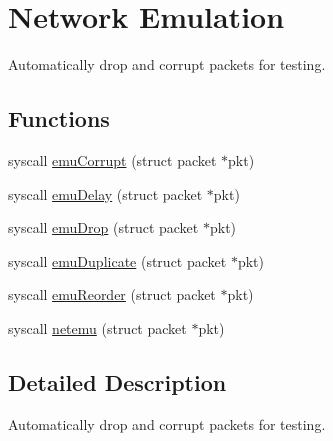 \hypertarget{group__netemu}{\section{Network Emulation}
\label{group__netemu}
}


Automatically drop and corrupt packets for testing.  


\subsection*{Functions}
\begin{DoxyCompactItemize}
\item 
syscall \hyperlink{group__netemu_ga9ef29c8409defba3de25097dfbcbc494}{emu\-Corrupt} (struct packet $\ast$pkt)
\item 
syscall \hyperlink{group__netemu_ga359a941b04b0c3f0464f7309b07f9aef}{emu\-Delay} (struct packet $\ast$pkt)
\item 
syscall \hyperlink{group__netemu_ga94997b23c2ec67ca99bbab49250ca174}{emu\-Drop} (struct packet $\ast$pkt)
\item 
syscall \hyperlink{group__netemu_ga63275952784ca47843b0415c7c3a537a}{emu\-Duplicate} (struct packet $\ast$pkt)
\item 
syscall \hyperlink{group__netemu_ga25c67cf36119d7df8af818b9c31bfd6b}{emu\-Reorder} (struct packet $\ast$pkt)
\item 
syscall \hyperlink{group__netemu_ga2d205d821bc09c94522da6cb7c1e5bca}{netemu} (struct packet $\ast$pkt)
\end{DoxyCompactItemize}


\subsection{Detailed Description}
Automatically drop and corrupt packets for testing. 

